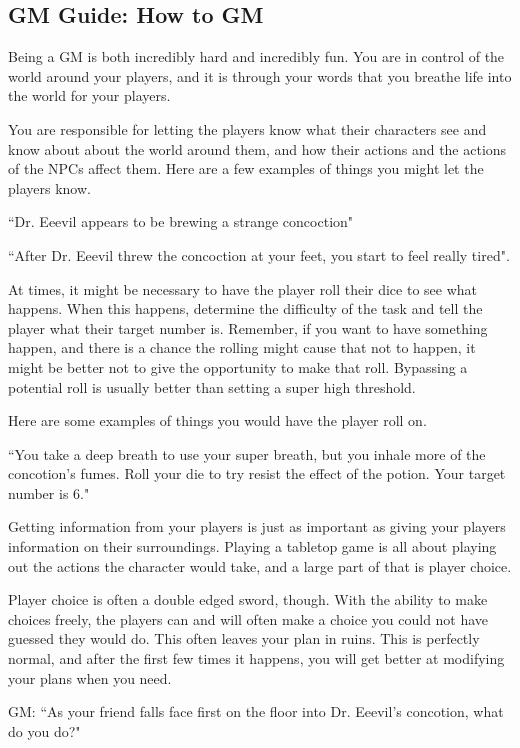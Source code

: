 \begin{flushleft}

\chapter{GM Guide: How to GM}

Being a GM is both incredibly hard and incredibly fun. You are in control of
the world around your players, and it is through your words that you breathe
life into the world for your players.

You are responsible for letting the players know what their characters see and
know about about the world around them, and how their actions and the actions
of the NPCs affect them. Here are a few examples of things you might let the
players know.

``Dr. Eeevil appears to be brewing a strange concoction"

``After Dr. Eeevil threw the concoction at your feet, you start to feel really
tired".

At times, it might be necessary to have the player roll their dice to see what
happens. When this happens, determine the difficulty of the task and tell the
player what their target number is. Remember, if you want to have something
happen, and there is a chance the rolling might cause that not to happen,
it might be better not to give the opportunity to make that roll. Bypassing
a potential roll is usually better than setting a super high threshold.

Here are some examples of things you would have the player roll on.

``You take a deep breath to use your super breath, but you inhale more of the
concotion's fumes. Roll your die to try resist the effect of the potion. Your
target number is 6."

Getting information from your players is just as important as giving your
players information on their surroundings. Playing a tabletop game is all
about playing out the actions the character would take, and a large part of
that is player choice.

Player choice is often a double edged sword, though. With the ability to make
choices freely, the players can and will often make a choice you could not have
guessed they would do. This often leaves your plan in ruins. This is perfectly
normal, and after the first few times it happens, you will get better at
modifying your plans when you need.

GM: ``As your friend falls face first on the floor into Dr. Eeevil's
concotion, what do you do?"


\end{flushleft}
